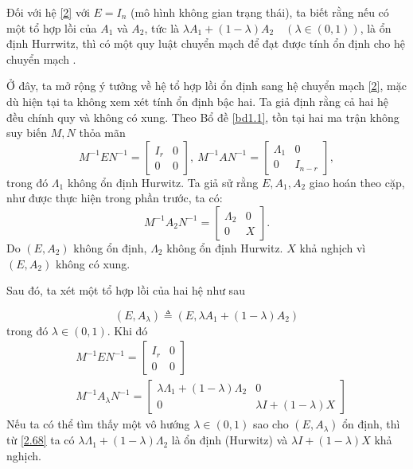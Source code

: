 \documentclass[12pt,a4paper]{report}
\theoremstyle{definition}
\theoremstyle{definition}
\numberwithin{dl}{chapter}
\numberwithin{vd}{chapter}
\numberwithin{corollary}{chapter}
\numberwithin{lemma}{chapter}
\numberwithin{md}{chapter}
\numberwithin{dn}{chapter}
\numberwithin{cy}{chapter}
\numberwithin{nx}{chapter}
\begin{document}
Đối với hệ \eqref{2} với $E=I_{n}$ (mô hình không gian trạng thái), ta biết rằng nếu có một tổ hợp lồi của $A_{1}$ và $A_{2}$, tức là $\lambda A_{1}+(1-\lambda) A_{2} \quad(\lambda \in(0,1))$, là ổn định Hurrwitz, thì có một quy luật chuyển mạch để đạt được tính ổn định cho hệ chuyển mạch \cite{Br98}.

Ở đây, ta mở rộng ý tưởng về hệ tổ hợp lồi ổn định sang hệ chuyển mạch \eqref{2}, mặc dù hiện tại ta không xem xét tính ổn định bậc hai.
Ta giả định rằng cả hai hệ đều chính quy và không có xung. Theo Bổ đề \ref{bd1.1}, tồn tại hai ma trận không suy biến $M, N$ thỏa mãn 
\begin{equation} \label{3}
M^{-1}E N^{-1}=\left[\begin{array}{cc}I_{r} & 0 \\ 0 & 0\end{array}\right],\ M^{-1} A N^{-1}=\left[\begin{array}{cc}\Lambda_{1} & 0 \\ 0 & I_{n-r}\end{array}\right],  
\end{equation}
trong đó  $\Lambda_{1}$ không ổn định Hurwitz. Ta giả sử rằng $E, A_{1}, A_{2}$ giao hoán theo cặp, như được thực hiện trong phần trước, ta có: 
\begin{equation}\label{2.66}
M^{-1} A_{2} N^{-1}=\left[\begin{array}{cc}
\Lambda_{2} & 0 \\
0 & X
\end{array}\right] .
\end{equation}
Do $\left(E, A_{2}\right)$ không ổn định, $\Lambda_{2}$ không ổn định Hurwitz. $X$ khả nghịch vì $\left(E, A_{2}\right)$ không có xung.

Sau đó, ta xét một tổ hợp lồi của hai hệ như sau

\begin{equation}\label{2.67}
\left(E, A_{\lambda}\right) \triangleq\left(E, \lambda A_{1}+(1-\lambda) A_{2}\right) 
\end{equation}
trong đó $\lambda \in(0,1)$. Khi đó
\begin{equation}\label{2.68}
\begin{aligned}
& M^{-1} E N^{-1}=\left[\begin{array}{ll}
I_{r} & 0 \\
0 & 0
\end{array}\right] \\
& M^{-1} A_{\lambda} N^{-1}=\left[\begin{array}{cc}
\lambda \Lambda_{1}+(1-\lambda) \Lambda_{2} & 0 \\
0 & \lambda I+(1-\lambda) X
\end{array}\right]
\end{aligned} 
\end{equation}
Nếu ta có thể tìm thấy một vô hướng $\lambda \in(0,1)$ sao cho $\left(E, A_{\lambda}\right)$ ổn định, thì từ \eqref{2.68} ta có $\lambda \Lambda_{1}+(1-\lambda) \Lambda_{2}$ là ổn định (Hurwitz) và $\lambda I+(1-\lambda) X$ khả nghịch.
\end{document}
